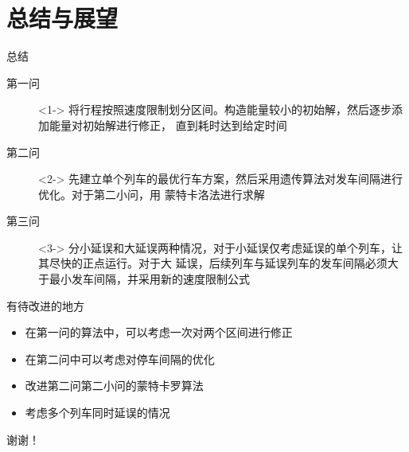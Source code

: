 \documentclass{beamer}
\begin{document}
\section{总结与展望}
\begin{frame}{总结}
\begin{description}
  \item[第一问]<1-> 将行程按照速度限制划分区间。构造能量较小的初始解，然后逐步添加能量对初始解进行修正，
  直到耗时达到给定时间
  \item[第二问]<2-> 先建立单个列车的最优行车方案，然后采用遗传算法对发车间隔进行优化。对于第二小问，用
  蒙特卡洛法进行求解
  \item[第三问]<3-> 分小延误和大延误两种情况，对于小延误仅考虑延误的单个列车，让其尽快的正点运行。对于大
延误，后续列车与延误列车的发车间隔必须大于最小发车间隔，并采用新的速度限制公式
\end{description}

\end{frame}

\begin{frame}{有待改进的地方}
\begin{itemize}
  \item<1-> 在第一问的算法中，可以考虑一次对两个区间进行修正
  \item<2-> 在第二问中可以考虑对停车间隔的优化
  \item<3-> 改进第二问第二小问的蒙特卡罗算法
  \item<4-> 考虑多个列车同时延误的情况
\end{itemize}

\end{frame}

\begin{frame}[c]
\begin{center}
\Huge 谢谢！
\end{center}
\end{frame}
\end{document}
